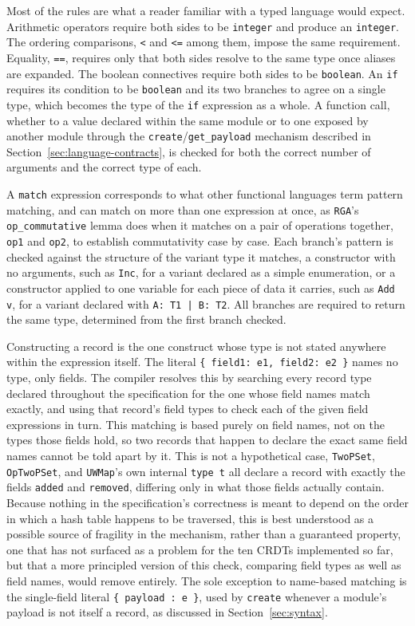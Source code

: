 Most of the rules are what a reader familiar with a typed language would expect. Arithmetic operators require both sides
to be \texttt{integer} and produce an \texttt{integer}. The ordering comparisons, \texttt{<} and \texttt{<=} among them,
impose the same requirement. Equality, \texttt{==}, requires only that both sides resolve to the same type once aliases
are expanded. The boolean connectives require both sides to be \texttt{boolean}. An \texttt{if} requires its condition to
be \texttt{boolean} and its two branches to agree on a single type, which becomes the type of the \texttt{if} expression
as a whole. A function call, whether to a value declared within the same module or to one exposed by another module
through the \texttt{create}/\texttt{get\_payload} mechanism described in Section~\ref{sec:language-contracts}, is checked for both the correct
number of arguments and the correct type of each.

A \texttt{match} expression corresponds to what other functional languages term pattern matching, and can match on more
than one expression at once, as \texttt{RGA}'s \texttt{op\_commutative} lemma does when it matches on a pair of operations
together, \texttt{op1} and \texttt{op2}, to establish commutativity case by case. Each branch's pattern is checked
against the structure of the variant type it matches, a constructor with no arguments, such as \texttt{Inc}, for a variant
declared as a simple enumeration, or a constructor applied to one variable for each piece of data it carries, such as
\texttt{Add v}, for a variant declared with \texttt{A: T1 | B: T2}. All branches are required to return the same type,
determined from the first branch checked.

Constructing a record is the one construct whose type is not stated anywhere within the expression itself. The literal
\texttt{\{ field1: e1, field2: e2 \}} names no type, only fields. The compiler resolves this by searching every record
type declared throughout the specification for the one whose field names match exactly, and using that record's field
types to check each of the given field expressions in turn. This matching is based purely on field names, not on the types
those fields hold, so two records that happen to declare the exact same field names cannot be told apart by it. This is
not a hypothetical case, \texttt{TwoPSet}, \texttt{OpTwoPSet}, and \texttt{UWMap}'s own internal \texttt{type t} all
declare a record with exactly the fields \texttt{added} and \texttt{removed}, differing only in what those fields actually
contain. Because nothing in the specification's correctness is meant to depend on the order in which a hash table happens
to be traversed, this is best understood as a possible source of fragility in the mechanism, rather than a guaranteed
property, one that has not surfaced as a problem for the ten CRDTs implemented so far, but that a more principled version
of this check, comparing field types as well as field names, would remove entirely. The sole exception to name-based
matching is the single-field literal \texttt{\{ payload : e \}}, used by \texttt{create} whenever a module's payload is
not itself a record, as discussed in Section~\ref{sec:syntax}.


